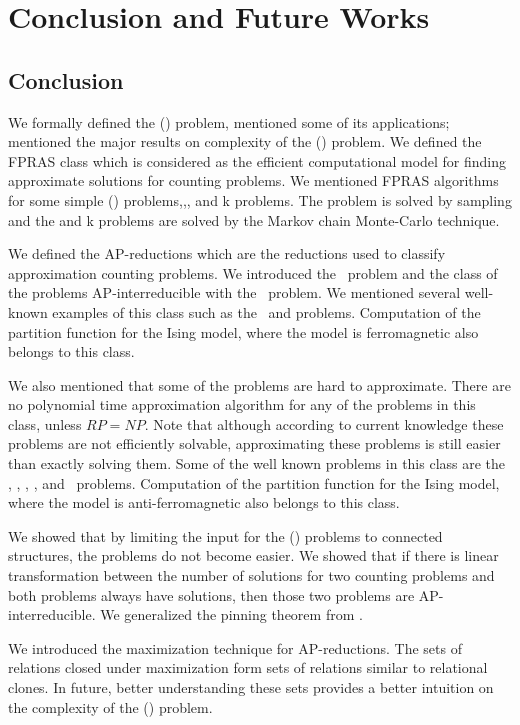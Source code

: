 \chapter{Conclusion and Future Works}
\section{Conclusion}
We formally defined the \ccsp(\mrelset) problem, mentioned some of its applications; mentioned the 
major results on complexity of the \ccsp(\mrelset) problem. We defined the
FPRAS class which is considered as the efficient computational model for finding approximate solutions
for counting problems.
We mentioned FPRAS algorithms for some simple \ccsp(\mrelset) problems,,, and k problems.
The  problem is solved by sampling and the  and k problems are solved by the Markov chain Monte-Carlo technique. 

We defined the AP-reductions which are the reductions used to classify approximation
counting problems.
We introduced the \cbis\ problem and the class of the problems AP-interreducible with the \cbis\ problem.
We mentioned several well-known examples of this class such as
the \cdsp\ and  problems. Computation of the partition function for 
the Ising model, where the model is ferromagnetic also belongs to this class.

We also mentioned that some of the problems are hard to approximate. There are
no polynomial time approximation algorithm for any of the problems in this class, unless \(RP=NP\)\@.
Note that although according to current knowledge these problems are not efficiently solvable,
approximating these problems is still easier than exactly solving them.
Some of the well known problems in this 
class are the \cdsat, \ctsat, \csat, \cisp, and \ctcol\ problems. Computation of the partition function for 
the Ising model, where the model is anti-ferromagnetic also belongs to this class.

We showed that by limiting the input for the \ccsp(\mrelset) problems to connected structures,
the problems do not become easier. We showed that if there is linear transformation 
between the number of solutions for two counting problems and 
both problems always have solutions, then those two problems are AP-interreducible.
We generalized the pinning theorem from \cite{Trichotomy}\@. 

We introduced the maximization technique for AP-reductions. The sets of relations closed
under maximization form sets of relations similar to relational clones.
In future, better understanding these sets provides a better intuition on the complexity of 
the \ccsp(\mrelset) problem.

